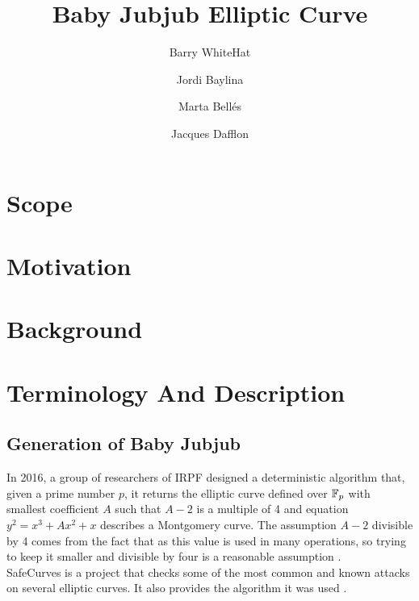 \documentclass{article}
\title{ Baby Jubjub Elliptic Curve \vspace{-0.2cm} }
\author[1]{Barry WhiteHat}
\author[2]{Jordi Baylina}
\author[2,3]{Marta Bellés}
\author[2]{Jacques Dafflon}
\affil[1]{Ethereum foundation}
\affil[2]{iden3}
\affil[3]{Universitat Pompeu Fabra}
\date{} %
\begin{document}
\begin{spacing}{1.2}	
\maketitle 
\vspace{1.5cm}
\tableofcontents
\vspace{0.5cm}


\newpage

\section{Scope}
	

\section{Motivation}
	

\section{Background}
	

\section{Terminology And Description}
	\subsection{Generation of Baby Jubjub}

	In 2016, a group of researchers of IRPF designed a deterministic algorithm that, given a prime number $p$, it returns the elliptic curve defined over $\mathbb{F}_p$ with smallest coefficient $A$ such that $A-2$ is a multiple of 4 and equation $y^2 = x^3 + Ax^2 + x$ describes a Montgomery curve. The assumption $A-2$ divisible by 4 comes from the fact that as 
	this value is used in many operations, so trying to keep it smaller and divisible by four is a reasonable assumption \cite{generation-baby}. \\

	SafeCurves is a project that checks some of the most common and known attacks on several elliptic curves. It also provides the algorithm it was used \cite{safe-curves}.\\ 
	

\end{spacing}
\end{document}
